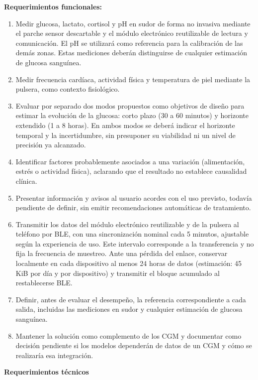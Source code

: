 \noindent\textbf{Requerimientos funcionales:}
\begin{enumerate}
    \item Medir glucosa, lactato, cortisol y pH en sudor de forma no invasiva mediante el parche sensor descartable y el módulo electrónico reutilizable de lectura y comunicación. El pH se utilizará como referencia para la calibración de las demás zonas. Estas mediciones deberán distinguirse de cualquier estimación de glucosa sanguínea.
    \item Medir frecuencia cardíaca, actividad física y temperatura de piel mediante la pulsera, como contexto fisiológico.
    \item Evaluar por separado dos modos propuestos como objetivos de diseño para estimar la evolución de la glucosa: corto plazo (30 a 60 minutos) y horizonte extendido (1 a 8 horas). En ambos modos se deberá indicar el horizonte temporal y la incertidumbre, sin presuponer su viabilidad ni un nivel de precisión ya alcanzado.
    \item Identificar factores probablemente asociados a una variación (alimentación, estrés o actividad física), aclarando que el resultado no establece causalidad clínica.
    \item Presentar información y avisos al usuario acordes con el uso previsto, todavía pendiente de definir, sin emitir recomendaciones automáticas de tratamiento.
    \item Transmitir los datos del módulo electrónico reutilizable y de la pulsera al teléfono por BLE, con una sincronización nominal cada 5 minutos, ajustable según la experiencia de uso. Este intervalo corresponde a la transferencia y no fija la frecuencia de muestreo. Ante una pérdida del enlace, conservar localmente en cada dispositivo al menos 24 horas de datos (estimación: 45 KiB por día y por dispositivo) y transmitir el bloque acumulado al restablecerse BLE.
    \item Definir, antes de evaluar el desempeño, la referencia correspondiente a cada salida, incluidas las mediciones en sudor y cualquier estimación de glucosa sanguínea.
    \item Mantener la solución como complemento de los CGM y documentar como decisión pendiente si los modelos dependerán de datos de un CGM y cómo se realizaría esa integración.
\end{enumerate}
\newpage
\noindent\textbf{Requerimientos técnicos}
\par\medskip
